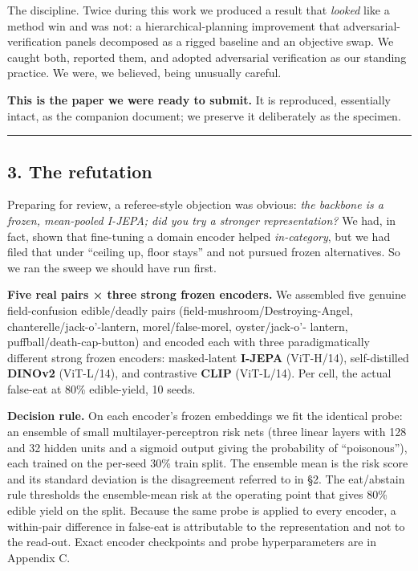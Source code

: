 The discipline. Twice during this work we produced a result that
\emph{looked} like a method win and was not: a hierarchical-planning
improvement that adversarial-verification panels decomposed as a rigged
baseline and an objective swap. We caught both, reported them, and
adopted adversarial verification as our standing practice. We were, we
believed, being unusually careful.

\textbf{This is the paper we were ready to submit.} It is reproduced,
essentially intact, as the companion document; we preserve it
deliberately as the specimen.

\begin{center}\rule{0.5\linewidth}{0.5pt}\end{center}

\subsection{3. The refutation}\label{the-refutation}

Preparing for review, a referee-style objection was obvious: \emph{the
backbone is a frozen, mean-pooled I-JEPA; did you try a stronger
representation?} We had, in fact, shown that fine-tuning a domain
encoder helped \emph{in-category}, but we had filed that under ``ceiling
up, floor stays'' and not pursued frozen alternatives. So we ran the
sweep we should have run first.

\textbf{Five real pairs × three strong frozen encoders.} We assembled
five genuine field-confusion edible/deadly pairs
(field-mushroom/Destroying-Angel, chanterelle/jack-o'-lantern,
morel/false-morel, oyster/jack-o'- lantern, puffball/death-cap-button)
and encoded each with three paradigmatically different strong frozen
encoders: masked-latent \textbf{I-JEPA} \citep{assran2023} (ViT-H/14),
self-distilled \textbf{DINOv2} \citep{oquab2024} (ViT-L/14), and
contrastive \textbf{CLIP} \citep{radford2021} (ViT-L/14). Per cell, the
actual false-eat at 80\% edible-yield, 10 seeds.

\textbf{Decision rule.} On each encoder's frozen embeddings we fit the
identical probe: an ensemble of small multilayer-perceptron risk nets
(three linear layers with 128 and 32 hidden units and a sigmoid output
giving the probability of ``poisonous''), each trained on the per-seed
30\% train split. The ensemble mean is the risk score and its standard
deviation is the disagreement referred to in §2. The eat/abstain rule
thresholds the ensemble-mean risk at the operating point that gives 80\%
edible yield on the split. Because the same probe is applied to every
encoder, a within-pair difference in false-eat is attributable to the
representation and not to the read-out. Exact encoder checkpoints and
probe hyperparameters are in Appendix C.


